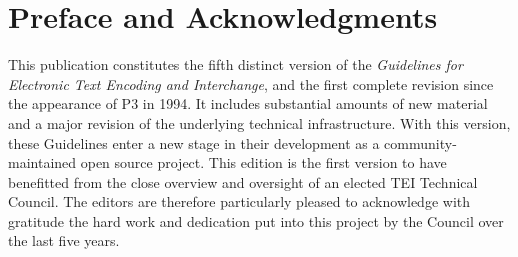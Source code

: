 
\section[{Preface and Acknowledgments}]{Preface and Acknowledgments}\label{FM1}\par
This publication constitutes the fifth distinct version of the \textit{Guidelines for Electronic Text Encoding and Interchange}, and the first complete revision since the appearance of P3 in 1994. It includes substantial amounts of new material and a major revision of the underlying technical infrastructure. With this version, these Guidelines enter a new stage in their development as a community-maintained open source project. This edition is the first version to have benefitted from the close overview and oversight of an elected TEI Technical Council. The editors are therefore particularly pleased to acknowledge with gratitude the hard work and dedication put into this project by the Council over the last five years.\par
